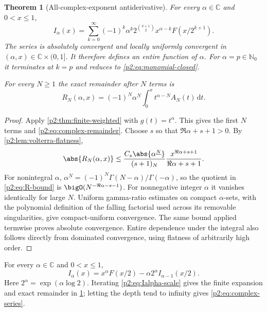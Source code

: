 \documentclass[11pt,oneside]{article}
\newtheorem{theorem}{Theorem}[section]
\theoremstyle{definition}
\theoremstyle{remark}
\newcommand{\C}{\mathbb C}
\newcommand{\N}{\mathbb N}
\newcommand{\dd}{\,\mathrm d}
\newcommand{\fall}[2]{#1^{\underline{#2}}}
\newcommand{\1}{\mathbf 1}
\begin{document}
\begin{theorem}[All-complex-exponent antiderivative]
\label{p2:thm:complex-series}
For every $\alpha\in\C$ and $0<x\le1$,
\begin{equation}
 \boxed{
 I_\alpha(x)=\sum_{k=0}^{\infty}(-1)^k\fall{\alpha}{k}
 2^{\binom{k+1}{2}}x^{\alpha-k}F(x/2^{k+1}).}              \label{p2:eq:complex-series}
\end{equation}
The series is absolutely convergent and locally uniformly convergent in
$(\alpha,x)\in\C\times(0,1]$.  It therefore defines an entire function of
$\alpha$.  For $\alpha=p\in\N_0$ it terminates at $k=p$ and reduces to
\eqref{p2:eq:monomial-closed}.

For every $N\ge1$ the exact remainder after $N$ terms is
\begin{equation}
 R_N(\alpha,x)=(-1)^N\fall{\alpha}{N}
 \int_0^xt^{\alpha-N}A_N(t)\dd t.                          \label{p2:eq:complex-remainder}
\end{equation}
\end{theorem}

\begin{proof}
Apply \cref{p2:thm:finite-weighted} with $g(t)=t^\alpha$.  This gives the first
$N$ terms and \eqref{p2:eq:complex-remainder}.  Choose $s$ so that
$\Re\alpha+s+1>0$.  By \cref{p2:lem:volterra-flatness},
\begin{equation}
 \abs{R_N(\alpha,x)}
 \le \frac{C_s\abs{\fall{\alpha}{N}}}{(s+1)_N}
 \frac{x^{\Re\alpha+s+1}}{\Re\alpha+s+1}.                \label{p2:eq:R-bound}
\end{equation}
For nonintegral $\alpha$,
$\fall{\alpha}{N}=(-1)^N\Gamma(N-\alpha)/\Gamma(-\alpha)$, so the quotient
in \eqref{p2:eq:R-bound} is $\bigO(N^{-\Re\alpha-s-1})$.  For nonnegative integer
$\alpha$ it vanishes identically for large $N$.  Uniform gamma-ratio estimates
on compact $\alpha$-sets, with the polynomial definition of the falling
factorial used across its removable singularities, give compact-uniform
convergence.  The same bound applied termwise proves absolute convergence.
Entire dependence under the integral also follows directly from dominated
convergence, using flatness of arbitrarily high order.
\end{proof}

\begin{corollary}
\label{p2:cor:Ialpha-scale}
For every $\alpha\in\C$ and $0<x\le1$,
\begin{equation}
 \boxed{
 I_\alpha(x)=x^\alpha F(x/2)-\alpha2^\alpha
 I_{\alpha-1}(x/2).}                                      \label{p2:eq:Ialpha-scale}
\end{equation}
Here $2^\alpha=\exp(\alpha\log2)$.  Iterating
\eqref{p2:eq:Ialpha-scale} gives the finite expansion and exact remainder in
\cref{p2:thm:complex-series}; letting the depth tend to infinity gives
\eqref{p2:eq:complex-series}.
\end{corollary}
\end{document}
